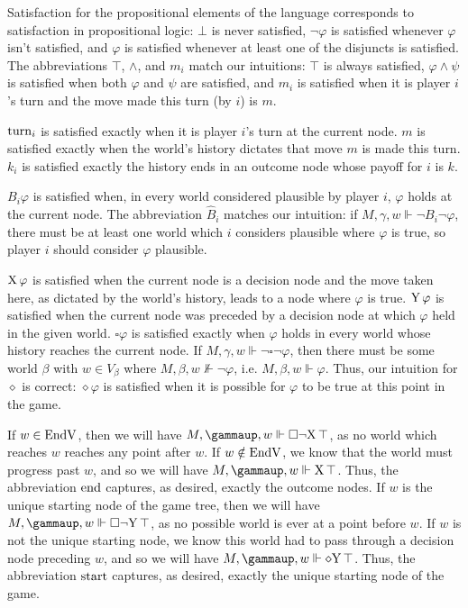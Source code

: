 \documentclass{article}
\begin{document}
Satisfaction for the propositional elements of the language corresponds to satisfaction in propositional logic: $\bot$ is never satisfied, $\lnot\varphi$ is satisfied whenever $\varphi$ isn't satisfied, and $\varphi$ is satisfied whenever at least one of the disjuncts is satisfied. The abbreviations $\top$, $\land$, and $m_i$ match our intuitions: $\top$ is always satisfied, $\varphi\land\psi$ is satisfied when both $\varphi$ and $\psi$ are satisfied, and $m_i$ is satisfied when it is player $i$'s turn and the move made this turn (by $i$) is $m$.

$\text{turn}_i$ is satisfied exactly when it is player $i$'s turn at the current node. $m$ is satisfied exactly when the world's history dictates that move $m$ is made this turn. $k_i$ is satisfied exactly the history ends in an outcome node whose payoff for $i$ is $k$.

$B_i\varphi$ is satisfied when, in every world considered plausible by player $i$, $\varphi$ holds at the current node. The abbreviation $\widehat{B}_i$ matches our intuition: if $M,\gamma,w\Vdash\lnot B_i\lnot\varphi$, there must be at least one world which $i$ considers plausible where $\varphi$ is true, so player $i$ should consider $\varphi$ plausible.

$\text{X}\,\varphi$ is satisfied when the current node is a decision node and the move taken here, as dictated by the world's history, leads to a node where $\varphi$ is true. $\text{Y}\,\varphi$ is satisfied when the current node was preceded by a decision node at which $\varphi$ held in the given world. $\square\varphi$ is satisfied exactly when $\varphi$ holds in every world whose history reaches the current node.  If $M,\gamma,w\Vdash\lnot\square\lnot\varphi$, then there must be some world $\beta$ with $w\in V_{\beta}$ where $M,\beta,w\not\Vdash\lnot\varphi$, i.e. $M,\beta,w\Vdash\varphi$. Thus, our intuition for $\diamond$ is correct: $\diamond\varphi$ is satisfied when it is possible for $\varphi$ to be true at this point in the game.

If $w\in\text{EndV}$, then we will have $M,\gamma,w\Vdash\square\lnot\X\top$, as no world which reaches $w$ reaches any point after $w$. If $w\notin\text{EndV}$, we know that the world must progress past $w$, and so we will have $M,\gamma,w\Vdash\X\top$. Thus, the abbreviation $\text{end}$ captures, as desired, exactly the outcome nodes. If $w$ is the unique starting node of the game tree, then we will have $M,\gamma,w\Vdash\square\lnot\Y\top$, as no possible world is ever at a point before $w$. If $w$ is not the unique starting node, we know this world had to pass through a decision node preceding $w$, and so we will have $M,\gamma,w\Vdash\diamond\Y\top$. Thus, the abbreviation $\text{start}$ captures, as desired, exactly the unique starting node of the game.
\end{document}
